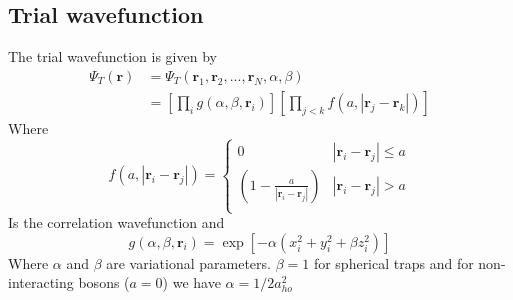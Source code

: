 \documentclass[
    a4paper, aps, twocolumn, floatfix, superscriptaddress,
    nofootinbib]{revtex4-1}
\begin{document}
\newpage
\begin{appendices}

\section{Trial wavefunction}
The trial wavefunction is given by
\begin{align}\label{trial_wavefunction}
    \Psi_T(\boldsymbol{r}) &= \Psi_T(\boldsymbol{r}_1,\boldsymbol{r}_2,...,\boldsymbol{r}_N,\alpha,\beta) \\
    &= \left[\prod_i g(\alpha,\beta,\boldsymbol{r}_i)\right] \left[\prod_{j<k} f(a,|\boldsymbol{r}_j - \boldsymbol{r}_k|)\right] \nonumber
\end{align}
Where
\begin{equation}\label{eq:2}
    f(a,|\boldsymbol{r}_i - \boldsymbol{r}_j|) =
    \begin{cases}
      0 & |\boldsymbol{r}_i - \boldsymbol{r}_j|\leq a \\
     \left(1-\frac{a}{|\boldsymbol{r}_i - \boldsymbol{r}_j|}\right) & |\boldsymbol{r}_i - \boldsymbol{r}_j| > a\\
    \end{cases} 
\end{equation}
Is the correlation wavefunction and 
\begin{equation}
    g(\alpha, \beta, \boldsymbol{r}_i) =  \exp[-\alpha(x_i^2 + y_i^2 + \beta z_i^2)]
\end{equation}
Where $\alpha$ and $\beta$ are variational parameters. $\beta = 1$ for spherical traps  and for non-interacting bosons ($a=0$) we have $\alpha = 1/2a_{ho}^2$ 
\newline

\end{appendices}
\end{document}

